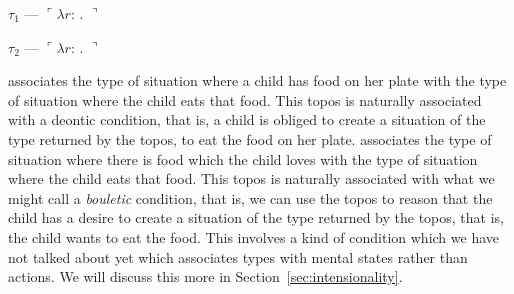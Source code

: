 \begin{ex} 
\begin{subex} 
 
\item $\tau_1$ --- $\ulcorner\lambda r$: . 
$\urcorner$
 
\item $\tau_2$ --- $\ulcorner\lambda r$: . 
$\urcorner$
 
\end{subex} 
\label{ex:topoi-eat-up-eat-like}   
\end{ex} 
 associates the type of situation where a child has food on
her plate with the type of situation where the child eats that food.
This topos is naturally associated with a deontic condition, that is,
a child is obliged to create a situation of the type returned by the
topos, to eat the food on her plate.   associates
the type of situation where there is food which the child loves with
the type of situation where the child eats that food.  This topos is
naturally associated with what we might call a \textit{bouletic}
condition, that is, we can use the topos to reason that the child has
a desire to create a situation of the type returned by the topos, that
is, the child wants to eat the food.  This involves a
kind of condition which we have not talked about yet which associates
types with mental states rather than actions.  We will discuss this
more in Section~\ref{sec:intensionality}.

